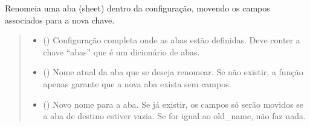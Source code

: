\documentclass[letterpaper,10pt,english]{sphinxmanual}
\begin{document}
\begin{fulllineitems}
\label{\detokenize{api/config:config.rename_sheet_key}}
\pysigstartsignatures
\pysiglinewithargsret
{}
{\sphinxparamcomma {}\sphinxparamcomma {}}
{}
\pysigstopsignatures
\sphinxAtStartPar
Renomeia uma aba (sheet) dentro da configuração, movendo os campos associados para a nova chave.
\begin{quote}\begin{description}
\begin{itemize}
\item {} 
\sphinxAtStartPar
{} () \textendash{} Configuração completa onde as abas estão definidas. Deve conter a chave “abas” que é um dicionário de abas.

\item {} 
\sphinxAtStartPar
{} () \textendash{} Nome atual da aba que se deseja renomear. Se não existir, a função apenas garante que a nova aba exista sem campos.

\item {} 
\sphinxAtStartPar
{} () \textendash{} Novo nome para a aba. Se já existir, os campos só serão movidos se a aba de destino estiver vazia. Se for igual ao old\_name, não faz nada.

\end{itemize}

\sphinxAtStartPar
{}

\end{description}\end{quote}

\end{fulllineitems}

\end{document}
